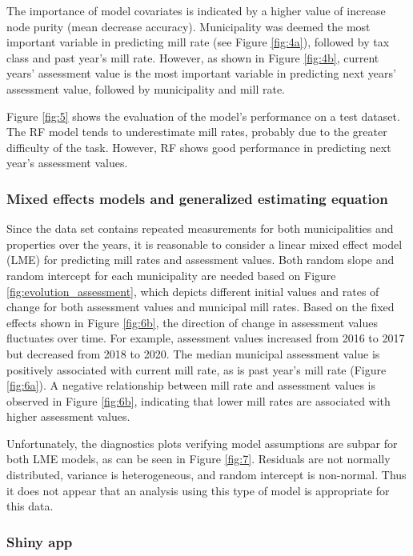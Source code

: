 \documentclass{article}
\begin{document}
The importance of model covariates is indicated by a higher value of increase node purity (mean decrease accuracy). Municipality was deemed the most important variable in predicting mill rate (see Figure \ref{fig:4a}), followed by tax class and past year's mill rate. However, as shown in Figure  \ref{fig:4b}, current years' assessment value is the most important variable in predicting next years' assessment value, followed by municipality and mill rate.


Figure \ref{fig:5} shows the evaluation of the model's performance on a test dataset. The RF model tends to underestimate mill rates, probably due to the greater difficulty of the task. However, RF shows good performance in predicting next year's assessment values.


\subsubsection{Mixed effects models and generalized estimating equation}
Since the data set contains repeated measurements for both municipalities and properties over the years, it is reasonable to consider a linear mixed effect model (LME) for predicting mill rates and assessment values. Both random slope and random intercept for each municipality are needed based on Figure \ref{fig:evolution_assessment}, which depicts different initial values and rates of change for both assessment values and municipal mill rates.  Based on the fixed effects shown in Figure \ref{fig:6b}, the direction of change in assessment values fluctuates over time. For example, assessment values increased from 2016 to 2017 but decreased from 2018 to 2020. The median municipal assessment value is positively associated with current mill rate, as is past year's mill rate (Figure \ref{fig:6a}). A negative relationship between mill rate and assessment values is observed in Figure \ref{fig:6b}, indicating that lower mill rates are associated with higher assessment values. 


Unfortunately, the diagnostics plots verifying model assumptions are subpar for both LME models, as can be seen in Figure \ref{fig:7}. Residuals are not normally distributed, variance is heterogeneous, and random intercept is non-normal.  Thus it does not appear that an analysis using this type of model is appropriate for this data.


\subsubsection{Shiny app}
\end{document}
